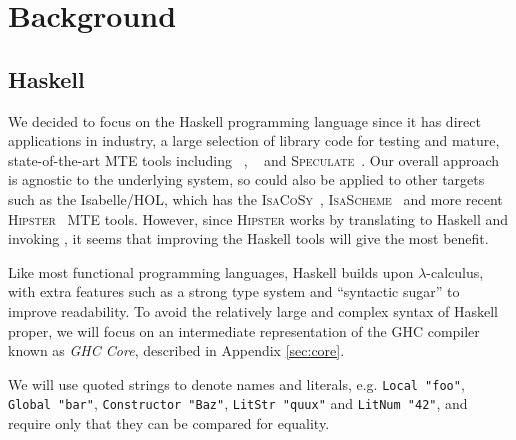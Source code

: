 \section{Background}
\label{sec:background}

\subsection{Haskell}
\label{sec:haskell}

\newcommand{\CVar}{\texttt{Var}}
\newcommand{\CLit}{\texttt{Lit}}
\newcommand{\CApp}{\texttt{App}}
\newcommand{\CLam}{\texttt{Lam}}
\newcommand{\CLet}{\texttt{Let}}
\newcommand{\CCase}{\texttt{Case}}
\newcommand{\CType}{\texttt{Type}}
\newcommand{\CLocal}{\texttt{Local}}
\newcommand{\CGlobal}{\texttt{Global}}
\newcommand{\CConstructor}{\texttt{Constructor}}
\newcommand{\CLitNum}{\texttt{LitNum}}
\newcommand{\CLitStr}{\texttt{LitStr}}
\newcommand{\CAlt}{\texttt{Alt}}
\newcommand{\CDataAlt}{\texttt{DataAlt}}
\newcommand{\CLitAlt}{\texttt{LitAlt}}
\newcommand{\CDefault}{\texttt{Default}}
\newcommand{\CNonRec}{\texttt{NonRec}}
\newcommand{\CRec}{\texttt{Rec}}
\newcommand{\CBind}{\texttt{Bind}}

We decided to focus on the Haskell programming language since it has direct
applications in industry, a large selection of library code for testing and
mature, state-of-the-art MTE tools including \qspec{}~\cite{QuickSpec},
\hspec{}~\cite{claessen2013automating} and
\textsc{Speculate}~\cite{braquehais2017speculate}. Our overall approach is
agnostic to the underlying system, so could also be applied to other targets
such as the Isabelle/HOL, which has the
\textsc{IsaCoSy}~\cite{johansson2009isacosy}, \textsc{IsaScheme}~\cite{omar} and
more recent \textsc{Hipster}~\cite{Hipster} MTE tools. However, since
\textsc{Hipster} works by translating to Haskell and invoking \hspec{}, it seems
that improving the Haskell tools will give the most benefit.

Like most functional programming languages, Haskell builds upon
$\lambda$-calculus, with extra features such as a strong type system and
``syntactic sugar'' to improve readability. To avoid the relatively large and
complex syntax of Haskell proper, we will focus on an intermediate
representation of the \textsc{GHC} compiler known as \emph{GHC Core}, described
in Appendix \ref{sec:core}.

We will use quoted strings to denote names and literals, e.g. \texttt{Local "foo"}, \texttt{Global "bar"}, \texttt{Constructor "Baz"}, \texttt{LitStr "quux"} and \texttt{LitNum "42"}, and require only that they can be compared for equality.

